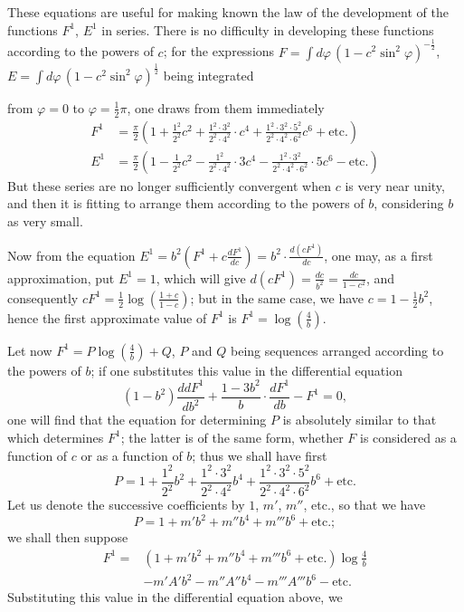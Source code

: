 \documentclass{article}
\begin{document}
These equations are useful for making known the law of the development of the functions $F^{1}$, $E^{1}$ in series. There is no difficulty in developing these functions according to the powers of $c$; for the expressions $F=\displaystyle\int d\varphi\,(1-c^{2}\sin^{2}\varphi)^{-\frac{1}{2}}$, $E=\displaystyle\int d\varphi\,(1-c^{2}\sin^{2}\varphi)^{\frac{1}{2}}$ being integrated

from $\varphi=0$ to $\varphi=\frac{1}{2}\pi$, one draws from them immediately
\[ \begin{aligned} F^{1}&=\frac{\pi}{2}\left(1+\frac{1^{2}}{2^{2}}c^{2}+\frac{1^{2}\cdot 3^{2}}{2^{2}\cdot 4^{2}}\cdot c^{4}+\frac{1^{2}\cdot 3^{2}\cdot 5^{2}}{2^{2}\cdot 4^{2}\cdot 6^{2}}c^{6}+\text{etc.}\right)\\ E^{1}&=\frac{\pi}{2}\left(1-\frac{1}{2^{2}}c^{2}-\frac{1^{2}}{2^{2}\cdot 4^{2}}\cdot 3c^{4}-\frac{1^{2}\cdot 3^{2}}{2^{2}\cdot 4^{2}\cdot 6^{2}}\cdot 5c^{6}-\text{etc.}\right) \end{aligned} \]
But these series are no longer sufficiently convergent when $c$ is very near unity, and then it is fitting to arrange them according to the powers of $b$, considering $b$ as very small.

Now from the equation $E^{1}=b^{2}\left(F^{1}+c\frac{dF^{1}}{dc}\right)=b^{2}\cdot\frac{d(cF^{1})}{dc}$, one may, as a first approximation, put $E^{1}=1$, which will give $d(cF^{1})=\frac{dc}{b^{2}}=\frac{dc}{1-c^{2}}$, and consequently $cF^{1}=\frac{1}{2}\log\left(\frac{1+c}{1-c}\right)$; but in the same case, we have $c=1-\frac{1}{2}b^{2}$, hence the first approximate value of $F^{1}$ is $F^{1}=\log\left(\frac{4}{b}\right)$.

Let now $F^{1}=P\log\left(\frac{4}{b}\right)+Q$, $P$ and $Q$ being sequences arranged according to the powers of $b$; if one substitutes this value in the differential equation
\[ (1-b^{2})\frac{ddF^{1}}{db^{2}}+\frac{1-3b^{2}}{b}\cdot\frac{dF^{1}}{db}-F^{1}=0, \]
one will find that the equation for determining $P$ is absolutely similar to that which determines $F^{1}$; the latter is of the same form, whether $F$ is considered as a function of $c$ or as a function of $b$; thus we shall have first
\[ P=1+\frac{1^{2}}{2^{2}}b^{2}+\frac{1^{2}\cdot 3^{2}}{2^{2}\cdot 4^{2}}b^{4}+\frac{1^{2}\cdot 3^{2}\cdot 5^{2}}{2^{2}\cdot 4^{2}\cdot 6^{2}}b^{6}+\text{etc.} \]
Let us denote the successive coefficients by $1$, $m'$, $m''$, etc., so that we have
\[ P=1+m'b^{2}+m''b^{4}+m'''b^{6}+\text{etc.}; \]
we shall then suppose
\[ \begin{aligned} F^{1}={}&(1+m'b^{2}+m''b^{4}+m'''b^{6}+\text{etc.})\log\frac{4}{b}\\ &-m'A'b^{2}-m''A''b^{4}-m'''A'''b^{6}-\text{etc.} \end{aligned} \]
Substituting this value in the differential equation above, we
\end{document}
